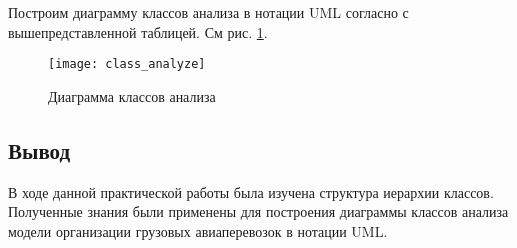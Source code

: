 \documentclass[a4paper,14pt]{extarticle}
\begin{document}
Построим диаграмму классов анализа в нотации UML согласно с вышепредставленной таблицей. См рис. \ref{img:class_analyze}.
\newpage
\begin{figure}[h!]
	\centering
	\texttt{[image: class\_analyze]}
	\caption{Диаграмма классов анализа}
	\label{img:class_analyze}
\end{figure}

\subsection{Вывод}
В ходе данной практической работы была изучена структура иерархии классов. Полученные знания были применены для построения диаграммы классов анализа модели организации грузовых авиаперевозок в нотации UML. 
	
\end{document}
